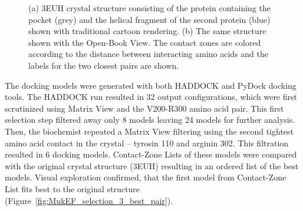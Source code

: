 \documentclass[twocolumn]{bmcart}%
\def\OpBook {Open-Book View\xspace}
\def\MatView {Matrix View\xspace}
\def\CoZoList{Contact-Zone List\xspace}
\def\CoZoLists{Contact-Zone Lists\xspace}
\begin{document}
\begin{figure}[b!]
	\vspace{-10pt}
    \centering
    \vspace{-5pt}
    \caption{(a) 3EUH crystal structure consisting of the protein containing the pocket (grey) and the helical fragment of the second protein (blue) shown with traditional cartoon rendering. (b) The same structure shown with the \OpBook. The contact zones are colored according to the distance between interacting amino acids and the labels for the two closest pairs are shown.}
  \label{fig:MukEF_crystal_3EUH_selected}
\end{figure}

The docking models were generated with both HADDOCK and PyDock docking tools.
The HADDOCK run resulted in 32 output configurations, which were first scrutinized using \MatView and the V200-R300 amino acid pair. 
This first selection step filtered away only 8 models leaving 24 models for further analysis. 
Then, the biochemist repeated a \MatView filtering using the second tightest amino acid contact in the crystal -- tyrosin 110 and arginin 302. 
This filtration resulted in 6 docking models. 
\CoZoLists of these models were compared with the original crystal structure (3EUH) resulting in an ordered list of the best models.
Visual exploration confirmed, that the first model from \CoZoList fits best to the original structure (Figure~\ref{fig:MukEF_selection_3_best_pair}).
\end{document}
